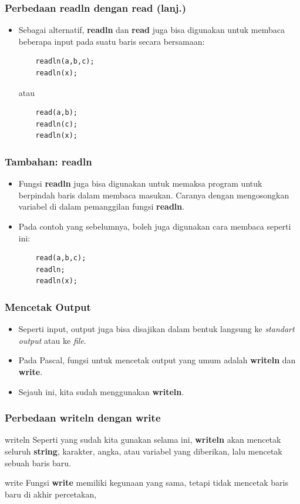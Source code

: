 \documentclass{beamer}
\begin{document}
\begin{frame}[fragile]
\frametitle{Perbedaan readln dengan read (lanj.)}
\begin{itemize}
	\item Sebagai alternatif, \textbf{readln} dan \textbf{read} juga bisa digunakan untuk membaca beberapa input pada suatu baris secara bersamaan:
	\begin{lstlisting}
	readln(a,b,c);
	readln(x);
	\end{lstlisting}
	atau
	\begin{lstlisting}
	read(a,b);
	readln(c);
	readln(x);
	\end{lstlisting}
\end{itemize}
\end{frame}

\begin{frame}[fragile]
\frametitle{Tambahan: readln}
\begin{itemize}
	\item Fungsi \textbf{readln} juga bisa digunakan untuk memaksa program untuk berpindah baris dalam membaca masukan. Caranya dengan mengosongkan variabel di dalam pemanggilan fungsi \textbf{readln}.
	\item Pada contoh yang sebelumnya, boleh juga digunakan cara membaca seperti ini:
	\begin{lstlisting}
	read(a,b,c);
	readln;
	readln(x);
	\end{lstlisting}
\end{itemize}
\end{frame}

\begin{frame}
\frametitle{Mencetak Output}
\begin{itemize}
	\item Seperti input, output juga bisa disajikan dalam bentuk langsung ke \textit{standart output} atau ke \textit{file}.
	\item Pada Pascal, fungsi untuk mencetak output yang umum adalah \alert{\textbf{writeln}} dan \alert{\textbf{write}}.
	\item Sejauh ini, kita sudah menggunakan \textbf{writeln}.
\end{itemize}
\end{frame}

\begin{frame}[fragile]
\frametitle{Perbedaan writeln dengan write}
\begin{block}{writeln}
	Seperti yang sudah kita gunakan selama ini, \textbf{writeln} akan mencetak seluruh \textbf{string}, karakter, angka, atau variabel yang diberikan, lalu \alert{mencetak} sebuah baris baru.
\end{block}
\begin{block}{write}
	Fungsi \textbf{write} memiliki kegunaan yang sama, tetapi \alert{tidak mencetak} baris baru di akhir percetakan,
\end{block}
\end{frame}
\end{document}
